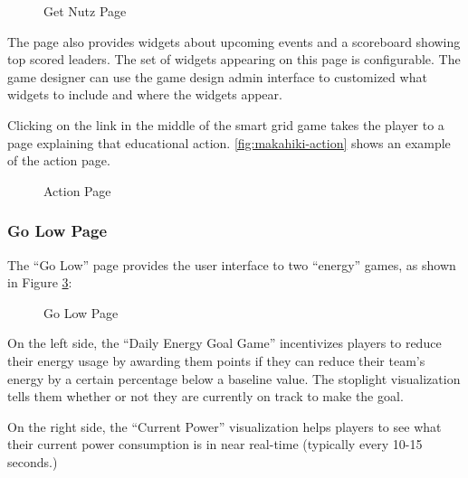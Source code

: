 \begin{figure}[!ht]
\begin{center}
\end{center}
\caption{Get Nutz Page}
\label{fig:makahiki-getnutz}
\end{figure}

The page also provides widgets about upcoming events and a scoreboard showing top scored leaders. The set of widgets appearing on this page is configurable. The game designer can use the game design admin interface to customized what widgets to include and where the widgets appear. 

Clicking on the link in the middle of the smart grid game takes the player to a page explaining that educational action.  \autoref{fig:makahiki-action} shows an example of the action page. 

\begin{figure}[!ht]
\begin{center}
\end{center}
\caption{Action Page}
\label{fig:makahiki-action}
\end{figure}

\clearpage

\subsubsection{Go Low Page}

The ``Go Low'' page provides the user interface to two ``energy'' games, as shown in Figure \ref{fig:makahiki-golow}:

\begin{figure}[!ht]
\begin{center}
\end{center}
\caption{Go Low Page}
\label{fig:makahiki-golow}
\end{figure}

On the left side, the ``Daily Energy Goal Game'' incentivizes players to reduce their energy usage by awarding them points if they can reduce their team's energy by a certain percentage below a baseline value. The stoplight visualization tells them whether or not they are currently on track to make the goal.

On the right side, the ``Current Power'' visualization helps players to see what their current power consumption is in near real-time (typically every 10-15 seconds.)

